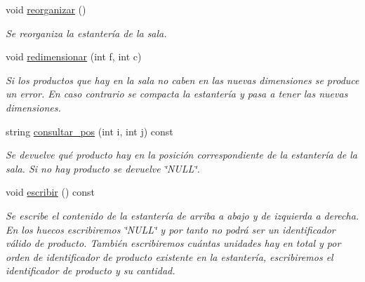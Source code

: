 \begin{DoxyCompactItemize}
void \hyperlink{class_sala_aaac8d848595b493ea08516f2101b829e}{reorganizar} ()
\begin{DoxyCompactList}\small\item\em Se reorganiza la estantería de la sala. \end{DoxyCompactList}\item 
void \hyperlink{class_sala_a1298ab7f3d8b1cf84c7bf6cfa69369a4}{redimensionar} (int f, int c)
\begin{DoxyCompactList}\small\item\em Si los productos que hay en la sala no caben en las nuevas dimensiones se produce un error. En caso contrario se compacta la estantería y pasa a tener las nuevas dimensiones. \end{DoxyCompactList}\item 
string \hyperlink{class_sala_a7a162d097c0f7e295cc17ceb286930b2}{consultar\+\_\+pos} (int i, int j) const 
\begin{DoxyCompactList}\small\item\em Se devuelve qué producto hay en la posición correspondiente de la estantería de la sala. Si no hay producto se devuelve \char`\"{}\+N\+U\+L\+L\char`\"{}. \end{DoxyCompactList}\item 
void \hyperlink{class_sala_a31cac453fd5002b715706482b207ac1f}{escribir} () const 
\begin{DoxyCompactList}\small\item\em Se escribe el contenido de la estantería de arriba a abajo y de izquierda a derecha. En los huecos escribiremos \char`\"{}\+N\+U\+L\+L\char`\"{} y por tanto no podrá ser un identificador válido de producto. También escribiremos cuántas unidades hay en total y por orden de identificador de producto existente en la estantería, escribiremos el identificador de producto y su cantidad. \end{DoxyCompactList}\end{DoxyCompactItemize}
